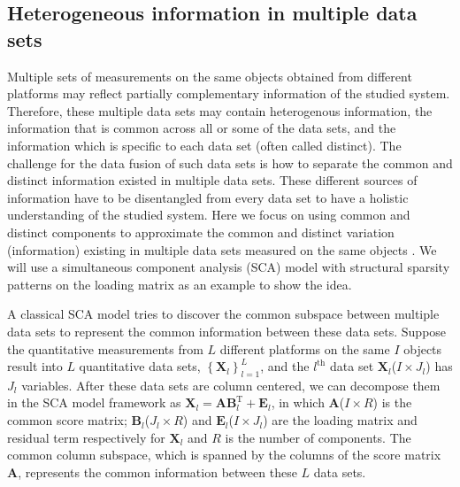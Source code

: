 \subsection{Heterogeneous information in multiple data sets}
Multiple sets of measurements on the same objects obtained from different platforms may reflect partially complementary information of the studied system. Therefore, these multiple data sets may contain heterogenous information, the information that is common across all or some of the data sets, and the information which is specific to each data set (often called distinct). The challenge for the data fusion of such data sets is how to separate the common and distinct information existed in multiple data sets. These different sources of information have to be disentangled from every data set to have a holistic understanding of the studied system. Here we focus on using common and distinct components to approximate the common and distinct variation (information) existing in multiple data sets measured on the same objects \cite{smilde2017common}. We will use a simultaneous component analysis (SCA) model with structural sparsity patterns on the loading matrix \cite{gaynanova2017structural} as an example to show the idea.

A classical SCA model tries to discover the common subspace between multiple data sets to represent the common information between these data sets. Suppose the quantitative measurements from $L$ different platforms on the same $I$ objects result into $L$ quantitative data sets, $\left\{\mathbf{X}_l \right\}_{l=1}^{L}$, and the $l^{\text{th}}$ data set $\mathbf{X}_l$($I \times J_l$) has $J_l$ variables. After these data sets are column centered, we can decompose them in the SCA model framework as $\mathbf{X}_l = \mathbf{AB}_l^{\text{T}} + \mathbf{E}_l$, in which $\mathbf{A}$($I\times R$) is the common score matrix; $\mathbf{B}_l$($J_l\times R$) and $\mathbf{E}_l$($I\times J_l$) are the loading matrix and residual term respectively for $\mathbf{X}_l$ and $R$ is the number of components. The common column subspace, which is spanned by the columns of the score matrix $\mathbf{A}$, represents the common information between these $L$ data sets.

